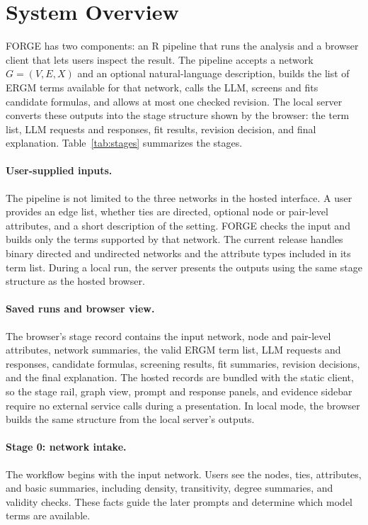 \documentclass[11pt]{article}
\begin{document}
\section{System Overview}
\label{sec:system}
FORGE has two components: an R pipeline that runs the analysis and a browser client that lets users inspect the result. The pipeline accepts a network $G=(V,E,X)$ and an optional natural-language description, builds the list of ERGM terms available for that network, calls the LLM, screens and fits candidate formulas, and allows at most one checked revision. The local server converts these outputs into the stage structure shown by the browser: the term list, LLM requests and responses, fit results, revision decision, and final explanation. Table~\ref{tab:stages} summarizes the stages.

\paragraph{User-supplied inputs.}
The pipeline is not limited to the three networks in the hosted interface. A user provides an edge list, whether ties are directed, optional node or pair-level attributes, and a short description of the setting. FORGE checks the input and builds only the terms supported by that network. The current release handles binary directed and undirected networks and the attribute types included in its term list. During a local run, the server presents the outputs using the same stage structure as the hosted browser.

\paragraph{Saved runs and browser view.}
The browser's stage record contains the input network, node and pair-level attributes, network summaries, the valid ERGM term list, LLM requests and responses, candidate formulas, screening results, fit summaries, revision decisions, and the final explanation. The hosted records are bundled with the static client, so the stage rail, graph view, prompt and response panels, and evidence sidebar require no external service calls during a presentation. In local mode, the browser builds the same structure from the local server's outputs.

\paragraph{Stage 0: network intake.}
The workflow begins with the input network. Users see the nodes, ties, attributes, and basic summaries, including density, transitivity, degree summaries, and validity checks. These facts guide the later prompts and determine which model terms are available.
\end{document}
